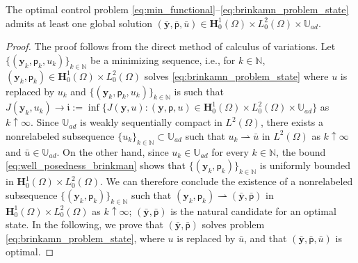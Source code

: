 \documentclass[final]{siamart0216}
\begin{document}
\begin{theorem}\label{theorem_existence_optimalcontrol} The optimal control problem \eqref{eq:min_functional}--\eqref{eq:brinkamn_problem_state} admits at least one global solution $(\bar{\mathbf{y}},\bar{\mathsf{p}},\bar{u})\in \mathbf{H}_0^1(\Omega)\times L_0^2(\Omega)\times \mathbb{U}_{ad}$.
\end{theorem}
\begin{proof}
The proof follows from the direct method of calculus of variations. Let $\{(\mathbf{y}_{k},\mathsf{p}_k,u_{k})\}_{k\in\mathbb{N}}$ be a minimizing sequence, i.e., for $k\in \mathbb{N}$, $(\mathbf{y}_{k},\mathsf{p}_k) \in \mathbf{H}_0^1(\Omega)\times L_0^2(\Omega)$ solves  \eqref{eq:brinkamn_problem_state} where $u$ is replaced by $u_{k}$ and $\{ (\mathbf{y}_{k}, \mathsf{p}_k,u_k) \}_{k \in \mathbb{N}}$ is such that $J(\mathbf{y}_{k},u_{k}) \rightarrow \mathfrak{i}:=\inf\{ J(\mathbf{y}, u):(\mathbf{y}, \mathsf{p}, u)\in \mathbf{H}_0^1(\Omega)\times L_0^2(\Omega) \times \mathbb{U}_{ad}\}$ as $k\uparrow \infty$. Since $\mathbb{U}_{ad}$ is weakly sequentially compact in $L^2(\Omega)$, there exists a nonrelabeled subsequence $\{u_{k}\}_{k\in\mathbb{N}} \subset \mathbb{U}_{ad}$ such that $u_{k}\rightharpoonup \bar{u}$ in $L^2(\Omega)$ as $ k \uparrow \infty$ and $\bar{u} \in \mathbb{U}_{ad}$. On the other hand, since $u_k\in\mathbb{U}_{ad}$ for every $k\in\mathbb{N}$, the bound \eqref{eq:well_posedness_brinkman} shows that $\{(\mathbf{y}_k,\mathsf{p}_k)\}_{k\in\mathbb{N}}$ is uniformly bounded in $\mathbf{H}_0^1(\Omega)\times L_0^2(\Omega)$. We can therefore conclude the existence of a nonrelabeled subsequence $\{(\mathbf{y}_k,\mathsf{p}_k)\}_{k\in\mathbb{N}}$ such that $(\mathbf{y}_k,\mathsf{p}_k)\rightharpoonup (\bar{\mathbf{y}},\bar{\mathsf{p}})$ in $\mathbf{H}_0^1(\Omega)\times L_0^2(\Omega)$ as $k\uparrow\infty$; $(\bar{\mathbf{y}},\bar{\mathsf{p}})$ is the natural candidate for an optimal state. In the following, we prove that $(\bar{\mathbf{y}},\bar{\mathsf{p}})$ solves problem \eqref{eq:brinkamn_problem_state}, where $u$ is replaced by $\bar{u}$, and that $(\bar{\mathbf{y}},\bar{\mathsf{p}},\bar{u})$ is optimal.


\end{proof}
\end{document}
